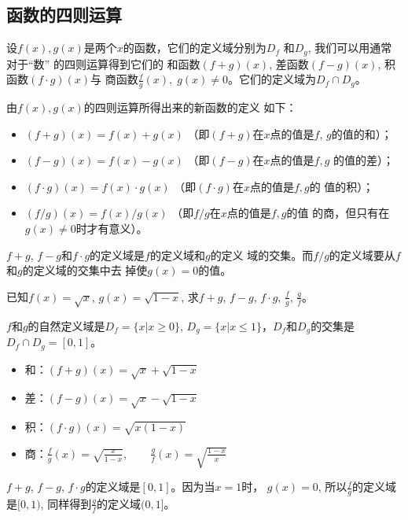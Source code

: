 \subsection{函数的四则运算}

设$f(x),g(x)$是两个$x$的函数，它们的定义域分别为$D_f$
和$D_g$, 我们可以用通常对于“数”
的四则运算得到它们的
和函数$(f+g)(x)$, 差函数$(f-g)(x)$, 积函数$(f\cdot g)(x)$与
商函数$\frac{f}{g}(x),\; g(x)\ne 0$。它们的定义域为$D_f\cap D_g$。

由$f(x),g(x)$的四则运算所得出来的新函数的定义
如下：
\begin{itemize}
    \item $(f+g)(x)=f(x)+g(x)$ （即$(f+g)$在$x$点的值是$f$,
$g$的值的和）；
\item $(f-g)(x)=f(x)-g(x)$ （即$(f-g)$在$x$点的值是$f,g$
的值的差）；
\item $(f\cdot g)(x)=f(x)\cdot g(x)$ （即$(f\cdot g)$在$x$点的值是$f,g$的
值的积）；
\item $(f/g)(x)=f(x)/g(x)$ （即$f/g$在$x$点的值是$f,g$的值
的商，但只有在$g(x)\ne 0$时才有意义）。
\end{itemize}

$f+g$, $f-g$和$f\cdot g$的定义域是$f$的定义域和$g$的定义
域的交集。而$f/g$的定义域要从$f$和$g$的定义域的交集中去
掉使$g(x)=0$的值。

\begin{example}
    已知$f(x)=\sqrt{x}$, $g(x)=\sqrt{1-x}$, 求$f+g$,
$f-g$, $f\cdot g$, $\frac{f}{g}$, $\frac{g}{f}$。
\end{example}

\begin{solution}
    $f$和$g$的自然定义域是$D_f=\{x|x\ge 0\}$, $D_g=\{x|x\le 1\}$，$D_f$和$D_g$的交集是$D_f\cap D_g=[0,1]$。
\begin{itemize}
    \item 和：$(f+g)(x)=\sqrt{x}+\sqrt{1-x}$
    \item 差：$(f-g)(x)=\sqrt{x}-\sqrt{1-x}$
    \item  积：$(f\cdot g)(x)=\sqrt{x(1-x)}$
    \item 商：$\frac{f}{g}(x)=\sqrt{\frac{x}{1-x}},\qquad \frac{g}{f}(x)=\sqrt{\frac{1-x}{x}}$
\end{itemize}

$f+g$, $f-g$, $f\cdot g$的定义域是$[0,1]$。因为当$x=1$时，
$g(x)=0$, 所以$\frac{f}{g}$的定义域是$[0,1)$, 同样得到$\frac{g}{f}$的定义域$(0,1]$。
\end{solution}

